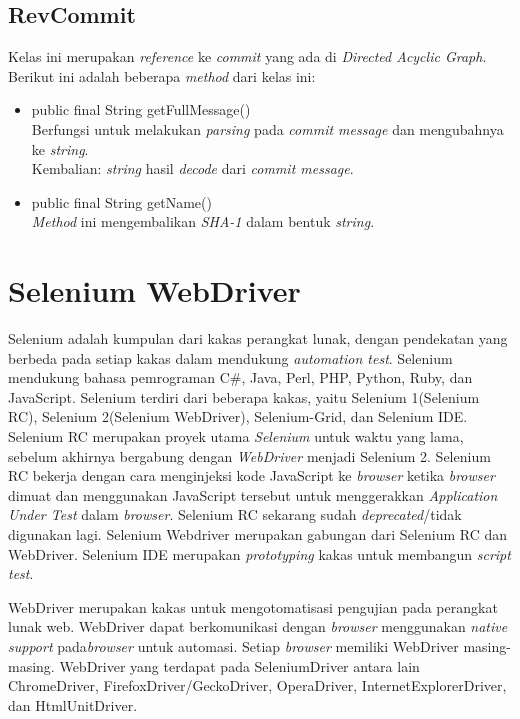 \subsection{RevCommit}
\label{subsec:revcommit}
Kelas ini merupakan \textit{reference} ke \textit{commit} yang ada di \textit{Directed Acyclic Graph}\cite{JGit_java_doc}. Berikut ini adalah beberapa \textit{method} dari kelas ini:
\begin{itemize}
\item public final String getFullMessage()\\
Berfungsi untuk melakukan \textit{parsing} pada \textit{commit message} dan mengubahnya ke \textit{string}.\\
Kembalian: \textit{string} hasil \textit{decode} dari \textit{commit message}.
\item public final String getName()\\
\textit{Method} ini mengembalikan \textit{SHA-1} dalam bentuk \textit{string}.
\end{itemize}

\section{Selenium WebDriver}
\label{sec:selenium_webdriver}
Selenium adalah kumpulan dari kakas perangkat lunak, dengan pendekatan yang berbeda pada setiap kakas dalam mendukung \textit{automation test}\cite{Selenium_doc}. Selenium mendukung bahasa pemrograman C\#, Java, Perl, PHP, Python, Ruby, dan JavaScript. Selenium terdiri dari beberapa kakas, yaitu Selenium 1(Selenium RC), Selenium 2(Selenium WebDriver), Selenium-Grid, dan Selenium IDE. Selenium RC merupakan proyek utama \textit{Selenium} untuk waktu yang lama, sebelum akhirnya bergabung dengan \textit{WebDriver} menjadi Selenium 2. Selenium RC bekerja dengan cara menginjeksi kode JavaScript ke \textit{browser} ketika \textit{browser} dimuat dan menggunakan JavaScript tersebut untuk menggerakkan \textit{Application Under Test} dalam \textit{browser}. Selenium RC sekarang sudah \textit{deprecated}/tidak digunakan lagi. Selenium Webdriver merupakan gabungan dari Selenium RC dan WebDriver. Selenium IDE merupakan \textit{prototyping} kakas untuk membangun \textit{script test}.

WebDriver merupakan kakas untuk mengotomatisasi pengujian pada perangkat lunak web\cite{Selenium_doc}. WebDriver dapat berkomunikasi dengan \textit{browser} menggunakan \textit{native support} pada\textit{browser} untuk automasi. Setiap \textit{browser} memiliki WebDriver masing-masing. WebDriver yang terdapat pada SeleniumDriver antara lain ChromeDriver, FirefoxDriver/GeckoDriver, OperaDriver, InternetExplorerDriver, dan HtmlUnitDriver. 


